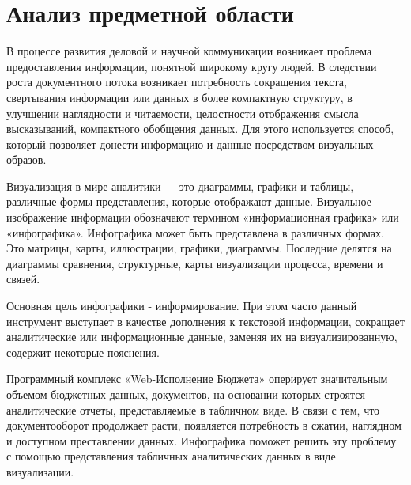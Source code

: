 \documentclass[a4paper]{extarticle}
\begin{document}
\newpage
\section{Анализ предметной области}
В процессе развития деловой и научной коммуникации возникает проблема предоставления информации, понятной широкому кругу людей. В следствии роста документного потока возникает потребность сокращения текста, свертывания информации или данных в более компактную структуру, в улучшении наглядности и читаемости, целостности отображения смысла высказываний, компактного обобщения данных. Для этого используется способ, который позволяет донести информацию и данные посредством визуальных образов.\par
Визуализация в мире аналитики — это диаграммы, графики и таблицы, различные формы представления, которые отображают данные. Визуальное изображение информации обозначают термином «информационная графика» или «инфографика». Инфографика может быть представлена в различных формах. Это матрицы, карты, иллюстрации, графики, диаграммы. Последние делятся на диаграммы сравнения, структурные, карты визуализации процесса, времени и связей.\par
Основная цель инфографики - информирование. При этом часто данный инструмент выступает в качестве дополнения к текстовой информации, сокращает аналитические или информационные данные, заменяя их на визуализированную, содержит некоторые пояснения.\par
Программный комплекс «Web-Исполнение Бюджета» оперирует значительным объемом бюджетных данных, документов, на основании которых строятся аналитические отчеты, представляемые в табличном виде. В связи с тем, что документооборот продолжает расти, появляется потребность в сжатии, наглядном и доступном преставлении данных. Инфографика поможет решить эту проблему с помощью представления табличных аналитических данных в виде визуализации.\par
\end{document}
